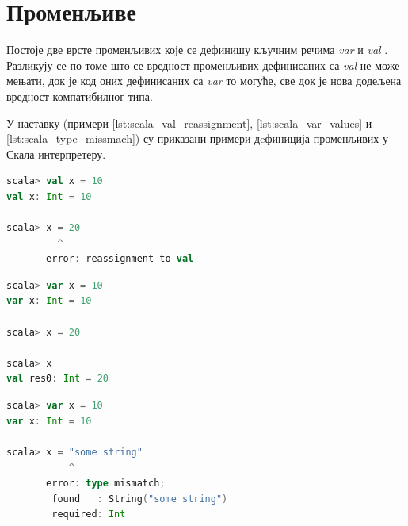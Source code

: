 \documentclass[12pt,oneside]{memoir}
\begin{document}
\section{Променљиве}
\label{sec:scala_prom}

Постоје две врсте променљивих које се дефинишу кључним речима \textit{var} и \textit{val} \cite{scala_prog}. Разликују се по томе што се вредност променљивих дефинисаних са \textit{val} не може мењати, док је код оних дефинисаних са \textit{var} то могуће, све док је нова додељена вредност компатибилног типа.

У наставку (примери \ref{lst:scala_val_reassignment}, \ref{lst:scala_var_values} и \ref{lst:scala_type_missmach}) су приказани примери дeфиниција променљивих у Скала интерпретеру.

\begin{lstlisting}[language=Scala, caption={Додељивање нове вредности \textit{val} променљивима}, label={lst:scala_val_reassignment}]
scala> val x = 10
val x: Int = 10

scala> x = 20
         ^
       error: reassignment to val
\end{lstlisting}

\begin{lstlisting}[language=Scala, caption={Додељивање нове вредности \textit{var} променљивима}, label={lst:scala_var_values}]
scala> var x = 10
var x: Int = 10

scala> x = 20

scala> x
val res0: Int = 20

\end{lstlisting}

\begin{lstlisting}[language=Scala, caption={Додељивање некомпатибилног типа}, label={lst:scala_type_missmach}]
scala> var x = 10
var x: Int = 10

scala> x = "some string"
           ^
       error: type mismatch;
        found   : String("some string")
        required: Int
\end{lstlisting}

%
%
%
%
%
%
\end{document}
